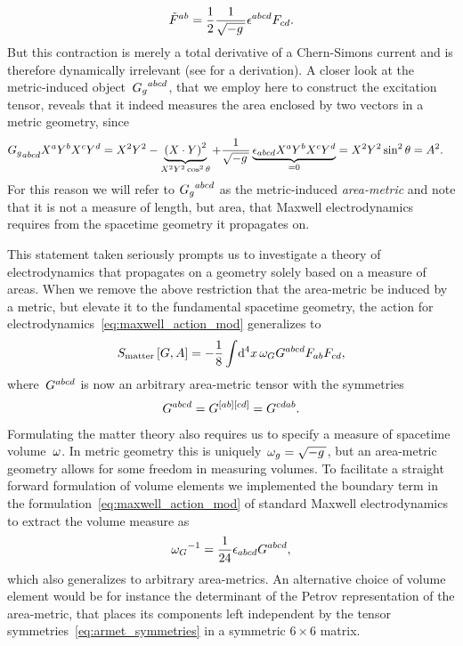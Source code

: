 \begin{equation}\label{eq:fstr_dual}
	\tilde{F}^{ab}=\frac{1}{2}\frac{1}{\sqrt{-g\,}}\epsilon^{abcd}F_{cd}
	\mathpunct{.}
\end{equation}
But this contraction is merely a total derivative of a Chern-Simons current and is therefore dynamically irrelevant (see  for a derivation). A closer look at the metric-induced object~${G_g}^{abcd}$, that we employ here to construct the excitation tensor, reveals that it indeed measures the area enclosed by two vectors in a metric geometry, since
\begin{align}
	{G_g}_{abcd}X^aY^bX^cY^d&=X^2Y^2-\underbrace{\left(X\cdot Y\right)^2}_{X^2Y^2\cos^2{\theta}}+\frac{1}{\sqrt{-g\,}}\underbrace{\epsilon_{abcd}X^aY^bX^cY^d}_{=0}=X^2Y^2\sin^2{\theta}=A^2
	\mathpunct{.}
\end{align}
For this reason we will refer to ${G_g}^{abcd}$ as the metric-induced \emph{area-metric} and note that it is not a measure of length, but area, that Maxwell electrodynamics requires from the spacetime geometry it propagates on.


This statement taken seriously prompts us to investigate a theory of electrodynamics that propagates on a geometry solely based on a measure of areas. When we remove the above restriction that the area-metric be induced by a metric, but elevate it to the fundamental spacetime geometry, the action for electrodynamics~\eqref{eq:maxwell_action_mod} generalizes to
\begin{equation}\label{eq:gled_action}
	\actmatter\left[\armet,\empot\right]=-\frac{1}{8}\intd{^4\coordx}\volel_\armet\armet^{abcd}\fstr_{ab}\fstr_{cd}
	\eqpunct{,}
\end{equation}
where~$G^{abcd}$ is now an arbitrary area-metric tensor with the symmetries
\begin{align}\label{eq:armet_symmetries}
	G^{abcd}=G^{[ ab][ cd]}=G^{cdab}
	\mathpunct{.}
\end{align}
Formulating the matter theory also requires us to specify a measure of spacetime volume~$\omega$. In metric geometry this is uniquely~$\omega_g=\sqrt{-g\,}$, but an area-metric geometry allows for some freedom in measuring volumes. To facilitate a straight forward formulation of volume elements we implemented the boundary term in the formulation~\eqref{eq:maxwell_action_mod} of standard Maxwell electrodynamics to extract the volume measure as
\begin{equation}\label{eq:gled_volel}
	{\omega_G}^{-1}=\frac{1}{24}\epsilon_{abcd}G^{abcd}
	\mathpunct{,}
\end{equation}
which also generalizes to arbitrary area-metrics. An alternative choice of volume element would be for instance the determinant of the Petrov representation of the area-metric, that places its components left independent by the tensor symmetries~\eqref{eq:armet_symmetries} in a symmetric $6\times 6$ matrix.

